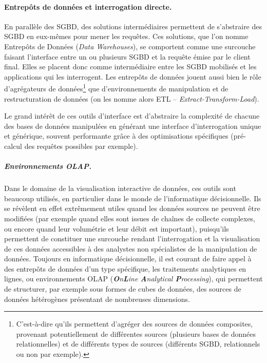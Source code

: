 \paragraph{Entrepôts de données et interrogation directe.}\label{par:interrogation-directe}

En parallèle des SGBD, des solutions \og intermédiaires\fg{} permettent de s'abstraire des SGBD en eux-mêmes pour mener les requêtes.
Ces solutions, que l'on nomme \og Entrepôts de Données\fg{} (\textit{Data Warehouses}), se comportent comme une surcouche faisant l'interface entre un ou plusieurs SGBD et la requête émise par le client final.
Elles se placent donc comme intermédiaire entre les SGBD mobilisés et les applications qui les interrogent.
Les entrepôts de données jouent aussi bien le rôle d'agrégateurs de données\footnote{
	C'est-à-dire qu'ils permettent d'agréger des sources de données composites, provenant potentiellement de différentes sources (plusieurs bases de données relationnelles) et de différents types de sources (différents SGBD, relationnels ou non par exemple).
} que d'environnements de manipulation et de restructuration de données (on les nomme alors \og ETL\fg{} -- \textit{Extract-Transform-Load}).

Le grand intérêt de ces outils d'interface est d'abstraire la complexité de chacune des bases de données manipulées en générant une interface d'interrogation unique et générique, souvent performante grâce à des optimisations spécifiques (pré-calcul des requêtes possibles par exemple).

\subparagraph{Environnements OLAP.}
Dans le domaine de la visualisation interactive de données, ces outils sont beaucoup utilisés, en particulier dans le monde de l'informatique décisionnelle.
Ils se révèlent en effet extrêmement utiles quand les données sources ne peuvent être modifiées (par exemple quand elles sont issues de chaînes de collecte complexes, ou encore quand leur volumétrie et leur débit est important), puisqu'ils permettent de constituer une surcouche rendant l'interrogation et la visualisation de ces données accessibles à des analystes non spécialistes de la manipulation de données.
Toujours en informatique décisionnelle, il est courant de faire appel à des entrepôts de données d'un type spécifique, les \og traitements analytiques en lignes\fg{}, ou environnements OLAP (\textit{\textbf{O}n\textbf{L}ine \textbf{A}nalytical \textbf{P}rocessing}), qui permettent de structurer, par exemple sous formes de cubes de données, des sources de données hétérogènes présentant de nombreuses dimensions.

